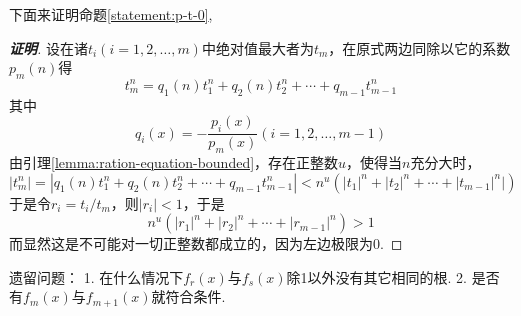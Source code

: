 \documentclass{ctexart}
\begin{document}
下面来证明命题\ref{statement:p-t-0},
\begin{proof}[\textbf{证明}]
  设在诸$t_i(i=1,2,\ldots,m)$中绝对值最大者为$t_m$，在原式两边同除以它的系数$p_m(n)$得
  \[ t_m^n = q_1(n)t_1^n+q_2(n)t_2^n+\cdots+q_{m-1}t_{m-1}^n \]
  其中
  \[ q_i(x) = - \frac{p_i(x)}{p_m(x)} (i=1,2,\ldots,m-1) \]
  由引理\ref{lemma:ration-equation-bounded}，存在正整数$u$，使得当$n$充分大时，
  \[ |t_m^n|=|q_1(n)t_1^n+q_2(n)t_2^n+\cdots+q_{m-1}t_{m-1}^n| < n^u(|t_1|^n+|t_2|^n+\cdots+|t_{m-1}|^n|) \]
  于是令$r_i=t_i/t_m$，则$|r_i| < 1$，于是
  \[ n^u(|r_1|^n+|r_2|^n+\cdots+|r_{m-1}|^n) > 1  \]
  而显然这是不可能对一切正整数都成立的，因为左边极限为0.
\end{proof}

遗留问题：
1. 在什么情况下$f_r(x)$与$f_s(x)$除1以外没有其它相同的根.
2. 是否有$f_m(x)$与$f_{m+1}(x)$就符合条件.
 
\end{document}
